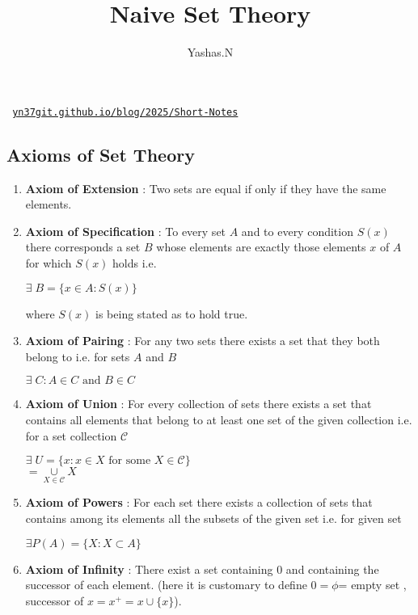 \documentclass[11pt]{extarticle}
\author{Yashas.N}
\title{Naive Set Theory}
\date{}
\newcommand{\w}[1]{\text{#1}}
\begin{document}
	\maketitle
	\begin{center}\texttt{
			\href{https://yn37git.github.io/blog/2025/Short-Notes/}{yn37git.github.io/blog/2025/Short-Notes}}
	\end{center} 
	
	\boldmath
	
\begin{multicols}{2}
	\tableofcontents
	
\section{Axioms of Set Theory }
\begin{enumerate}
	\item \textbf{Axiom of Extension} : Two sets are equal if only if they have the same elements.
	\item \textbf{Axiom of Specification} : To every set $A$ and to every condition $S(x)$ there corresponds a set $B$ whose elements are exactly those elements $x$ of $A$ for which $S(x)$ holds i.e.
	\begin{center}
		$\exists \; B=\{x\in A:S(x)\}$
	\end{center}
	where $S(x)$ is being stated as to hold true.
	\item \textbf{Axiom of Pairing} : For any two sets there exists a set that they both belong to i.e. for sets $A$ and $B$
	\begin{center}
		$\exists \; C : A\in C \w{ and } B\in C $
	\end{center}
	\item \textbf{Axiom of Union} : For every collection of sets there exists a set that contains all elements that belong to at least one set of the given collection i.e. for a set collection $\mathscr{C}$ 
	\begin{center}
		$\exists \; U =\{ x: x\in X \w{ for some }X \in \mathscr{C}\}$\\
		$= \underset{X\in \mathscr{C}}{\cup} X$
	\end{center}
	\item \textbf{Axiom of Powers} : For each set there exists a collection of sets that contains among its elements all the subsets of the given set i.e. 
	for given set 
	\begin{center}
		$\exists P(A)=\{X:X\subset A\}$
	\end{center}
	\item \textbf{Axiom of Infinity} : There exist a set containing $0$ and containing the successor of each element. (here it is customary to define $0=\phi$= empty set , successor of $x=x^+=x \cup \{x\}$).
	

\end{enumerate}
\end{multicols}
\end{document}
